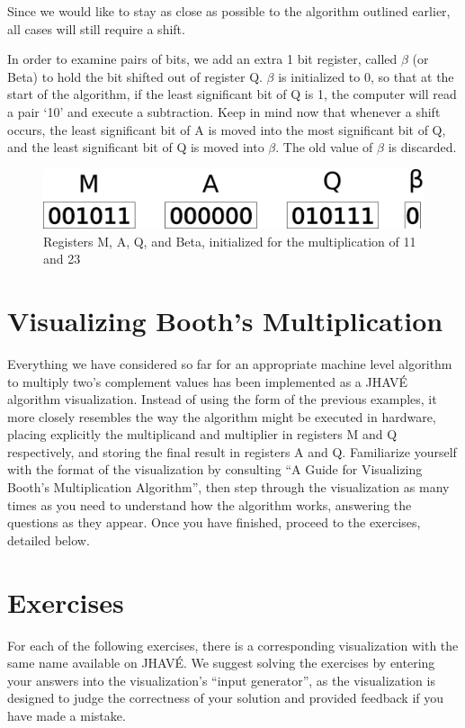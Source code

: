 \documentclass{article}
\begin{document}
Since we would like to stay as close as possible to the algorithm outlined earlier, all cases will still require a shift.

    In order to examine pairs of bits, we add an extra 1 bit register, called $\beta$ (or Beta) to hold the bit shifted out of register Q.
$\beta$ is initialized to 0, so that at the start of the algorithm, if the least significant bit of Q is 1, the computer will read a pair `10' and execute a subtraction.
Keep in mind now that whenever a shift occurs, the least significant bit of A is moved into the most significant bit of Q, and the least significant bit of Q is moved into $\beta$.
The old value of $\beta$ is discarded.

\begin{figure}[h]
\centering
\includegraphics[scale=0.4]{init2.pdf}
\caption{Registers M, A, Q, and Beta, initialized for the multiplication of 11 and 23}
\end{figure}%

\pagebreak

\section{Visualizing Booth's Multiplication}
Everything we have considered so far for an appropriate machine level algorithm to multiply two's complement values has been implemented as a JHAVÉ algorithm visualization.
Instead of using the form of the previous examples, it more closely resembles the way the algorithm might be executed in hardware, placing explicitly the multiplicand and multiplier in registers M and Q respectively, and storing the final result in registers A and Q.
Familiarize yourself with the format of the visualization by consulting ``A Guide for Visualizing Booth’s Multiplication Algorithm'', then step through the visualization as many times as you need to understand how the algorithm works, answering the questions as they appear.
Once you have finished, proceed to the exercises, detailed below.

\section{Exercises}
For each of the following exercises, there is a corresponding visualization with the same name available on JHAVÉ.
We suggest solving the exercises by entering your answers into the visualization's ``input generator'', as the visualization is designed to judge the correctness of your solution and provided feedback if you have made a mistake.
\end{document}
